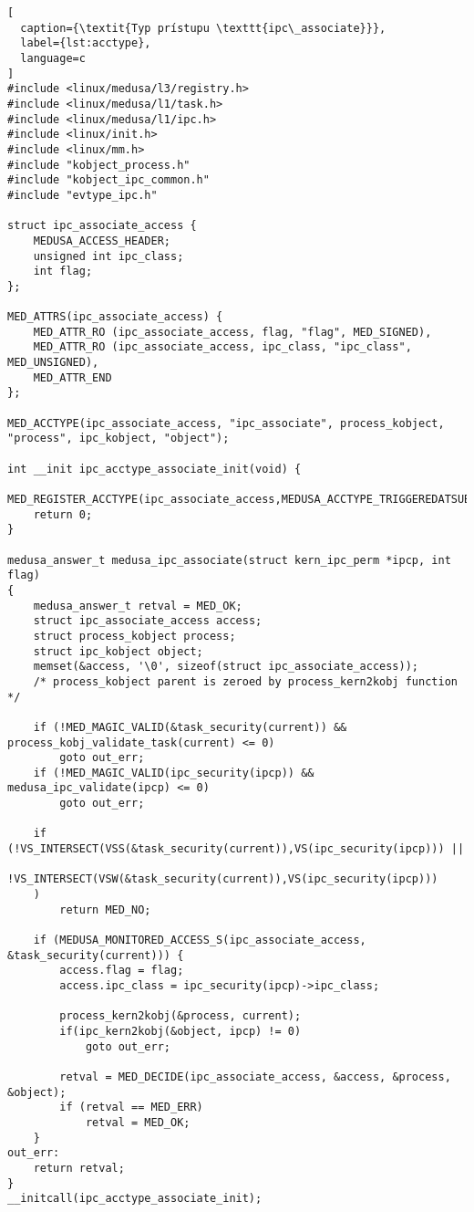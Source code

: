 \begin{lstlisting}[
  caption={\textit{Typ prístupu \texttt{ipc\_associate}}},
  label={lst:acctype},
  language=c
]
#include <linux/medusa/l3/registry.h>
#include <linux/medusa/l1/task.h>
#include <linux/medusa/l1/ipc.h>
#include <linux/init.h>
#include <linux/mm.h>
#include "kobject_process.h"
#include "kobject_ipc_common.h"
#include "evtype_ipc.h"

struct ipc_associate_access {
	MEDUSA_ACCESS_HEADER;
	unsigned int ipc_class;
	int flag;
};

MED_ATTRS(ipc_associate_access) {
	MED_ATTR_RO (ipc_associate_access, flag, "flag", MED_SIGNED),
	MED_ATTR_RO (ipc_associate_access, ipc_class, "ipc_class", MED_UNSIGNED),
	MED_ATTR_END
};

MED_ACCTYPE(ipc_associate_access, "ipc_associate", process_kobject, "process", ipc_kobject, "object");

int __init ipc_acctype_associate_init(void) {
	MED_REGISTER_ACCTYPE(ipc_associate_access,MEDUSA_ACCTYPE_TRIGGEREDATSUBJECT);
	return 0;
}

medusa_answer_t medusa_ipc_associate(struct kern_ipc_perm *ipcp, int flag)
{
	medusa_answer_t retval = MED_OK;
	struct ipc_associate_access access;
	struct process_kobject process;
	struct ipc_kobject object;
    memset(&access, '\0', sizeof(struct ipc_associate_access));
    /* process_kobject parent is zeroed by process_kern2kobj function */

	if (!MED_MAGIC_VALID(&task_security(current)) && process_kobj_validate_task(current) <= 0)
		goto out_err;
	if (!MED_MAGIC_VALID(ipc_security(ipcp)) && medusa_ipc_validate(ipcp) <= 0)
		goto out_err;

	if (!VS_INTERSECT(VSS(&task_security(current)),VS(ipc_security(ipcp))) ||
		!VS_INTERSECT(VSW(&task_security(current)),VS(ipc_security(ipcp)))
	)
		return MED_NO;
	
	if (MEDUSA_MONITORED_ACCESS_S(ipc_associate_access, &task_security(current))) {
		access.flag = flag;
		access.ipc_class = ipc_security(ipcp)->ipc_class;

		process_kern2kobj(&process, current);
		if(ipc_kern2kobj(&object, ipcp) != 0)
			goto out_err;

		retval = MED_DECIDE(ipc_associate_access, &access, &process, &object);
		if (retval == MED_ERR)
			retval = MED_OK;
	}
out_err:
	return retval;
}
__initcall(ipc_acctype_associate_init);
\end{lstlisting}
